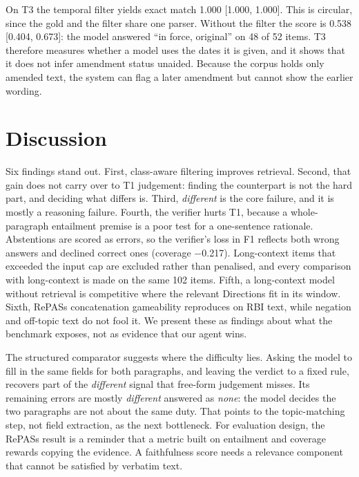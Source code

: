 \documentclass[conference]{IEEEtran}
\begin{document}
On T3 the temporal filter yields exact match 1.000 [1.000, 1.000]. This is circular, since the gold and the
filter share one parser. Without the filter the score is 0.538 [0.404, 0.673]: the model answered ``in force, original'' on
48 of 52 items. T3 therefore measures whether a model uses
the dates it is given, and it shows that it does not infer amendment status unaided. Because the corpus holds only amended text,
the system can flag a later amendment but cannot show the earlier wording.



\section{Discussion}\label{sec:discussion}
Six findings stand out. First, class-aware filtering improves retrieval. Second, that gain does not carry over to T1 judgement:
finding the counterpart is not the hard part, and deciding what differs is. Third, \textit{different} is the core failure, and it is
mostly a reasoning failure. Fourth, the verifier hurts T1, because a whole-paragraph entailment premise is a poor test for a
one-sentence rationale. Abstentions are scored as errors, so the verifier's loss in F1 reflects both wrong answers and declined
correct ones (coverage $-$0.217). Long-context items
that exceeded the input cap are excluded rather than penalised, and every comparison with long-context is made on the same
102 items. Fifth, a long-context model without retrieval is competitive where the relevant Directions fit in its window.
Sixth, RePASs concatenation gameability reproduces on RBI text, while negation and off-topic text do not fool it. We present these as
findings about what the benchmark exposes, not as evidence that our agent wins.

The structured comparator suggests where the difficulty lies. Asking the model to fill in the same fields for both paragraphs, and
leaving the verdict to a fixed rule, recovers part of the \textit{different} signal that free-form judgement misses. Its remaining
errors are mostly \textit{different} answered as \textit{none}: the model decides the two paragraphs are not about the same duty.
That points to the topic-matching step, not field extraction, as the next bottleneck. For evaluation design, the RePASs result is a
reminder that a metric built on entailment and coverage rewards copying the evidence. A faithfulness score needs a relevance
component that cannot be satisfied by verbatim text.
\end{document}
